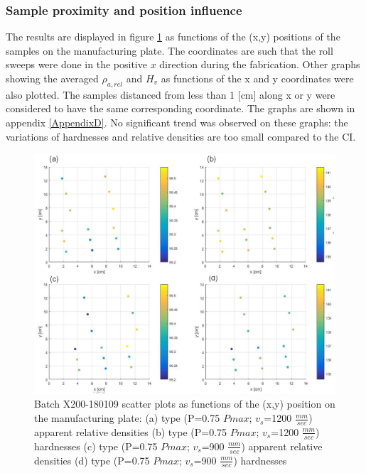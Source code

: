 \subsubsection{Sample proximity and position influence}
The results are displayed in figure \ref{fig:180109-HD} as functions of the (x,y) positions of the samples on the manufacturing plate. The coordinates are such that the roll sweeps were done in the positive $x$ direction during the fabrication. Other graphs showing the averaged $\rho_{a,rel}$ and $H_v$ as functions of the x and y coordinates were also plotted. The samples distanced from less than 1 [cm] along x or y were considered to have the same corresponding coordinate. The graphs are shown in appendix \ref{AppendixD}. No significant trend was observed on these graphs: the variations of hardnesses and relative densities are too small compared to the CI. \\
\begin{figure}[h!]
\centering
\centerline{\includegraphics[scale=0.62]{Images/180109-HD}}
\decoRule
\caption[Batch X200-180109 scatter plots as functions of the (x,y) position on the manufacturing plate: (a) type (P=0.75 $Pmax$; $v_s$=1200 $\frac{mm}{sec}$) apparent relative densities (b) type (P=0.75 $Pmax$; $v_s$=1200 $\frac{mm}{sec}$) hardnesses (c) type (P=0.75 $Pmax$; $v_s$=900 $\frac{mm}{sec}$) apparent relative densities (d) type (P=0.75 $Pmax$; $v_s$=900 $\frac{mm}{sec}$) hardnesses]{Batch X200-180109 scatter plots as functions of the (x,y) position on the manufacturing plate: (a) type (P=0.75 $Pmax$; $v_s$=1200 $\frac{mm}{sec}$) apparent relative densities (b) type (P=0.75 $Pmax$; $v_s$=1200 $\frac{mm}{sec}$) hardnesses (c) type (P=0.75 $Pmax$; $v_s$=900 $\frac{mm}{sec}$) apparent relative densities (d) type (P=0.75 $Pmax$; $v_s$=900 $\frac{mm}{sec}$) hardnesses}
\label{fig:180109-HD}
\end{figure} 

